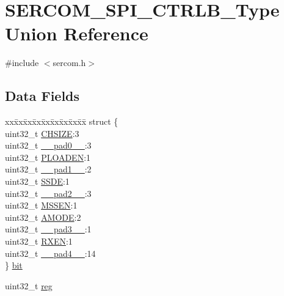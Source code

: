 \hypertarget{union_s_e_r_c_o_m___s_p_i___c_t_r_l_b___type}{}\section{S\+E\+R\+C\+O\+M\+\_\+\+S\+P\+I\+\_\+\+C\+T\+R\+L\+B\+\_\+\+Type Union Reference}
\label{union_s_e_r_c_o_m___s_p_i___c_t_r_l_b___type}


{\ttfamily \#include $<$sercom.\+h$>$}

\subsection*{Data Fields}
\begin{DoxyCompactItemize}
\item 
\begin{tabbing}
xx\=xx\=xx\=xx\=xx\=xx\=xx\=xx\=xx\=\kill
struct \{\\
\>uint32\_t \mbox{\hyperlink{union_s_e_r_c_o_m___s_p_i___c_t_r_l_b___type_a3c8e201cb02258c25ae7f86c3e0278a9}{CHSIZE}}:3\\
\>uint32\_t \mbox{\hyperlink{union_s_e_r_c_o_m___s_p_i___c_t_r_l_b___type_a3e57c2ef1c3ffb36722f000cc1156824}{\_\_pad0\_\_}}:3\\
\>uint32\_t \mbox{\hyperlink{union_s_e_r_c_o_m___s_p_i___c_t_r_l_b___type_ab8f30faceec09251162c837b4213c4ff}{PLOADEN}}:1\\
\>uint32\_t \mbox{\hyperlink{union_s_e_r_c_o_m___s_p_i___c_t_r_l_b___type_a6712ba6dd1d5b43d2d56ff8ac4e275a7}{\_\_pad1\_\_}}:2\\
\>uint32\_t \mbox{\hyperlink{union_s_e_r_c_o_m___s_p_i___c_t_r_l_b___type_a7e822cdc42fd73e748479a932cb76f9d}{SSDE}}:1\\
\>uint32\_t \mbox{\hyperlink{union_s_e_r_c_o_m___s_p_i___c_t_r_l_b___type_a9ce12a63de64ef64ae2d59d128251cae}{\_\_pad2\_\_}}:3\\
\>uint32\_t \mbox{\hyperlink{union_s_e_r_c_o_m___s_p_i___c_t_r_l_b___type_aa7b17a676981dbf654e7899412e287a7}{MSSEN}}:1\\
\>uint32\_t \mbox{\hyperlink{union_s_e_r_c_o_m___s_p_i___c_t_r_l_b___type_adb6c7aee390994be1ca4ada847ccbf53}{AMODE}}:2\\
\>uint32\_t \mbox{\hyperlink{union_s_e_r_c_o_m___s_p_i___c_t_r_l_b___type_a4854608c0e776f0704a4d9a4b98ea57d}{\_\_pad3\_\_}}:1\\
\>uint32\_t \mbox{\hyperlink{union_s_e_r_c_o_m___s_p_i___c_t_r_l_b___type_a9251068a37a3410c80d0ff33e3767c03}{RXEN}}:1\\
\>uint32\_t \mbox{\hyperlink{union_s_e_r_c_o_m___s_p_i___c_t_r_l_b___type_a7b2edc85d90e34c4435951e1e5c59517}{\_\_pad4\_\_}}:14\\
\} \mbox{\hyperlink{union_s_e_r_c_o_m___s_p_i___c_t_r_l_b___type_aca89cc6ff3d19a1f17c5ad9f5a7606af}{bit}}\\

\end{tabbing}\item 
uint32\+\_\+t \mbox{\hyperlink{union_s_e_r_c_o_m___s_p_i___c_t_r_l_b___type_a6b91636401516a477989a336376d7b40}{reg}}
\end{DoxyCompactItemize}


